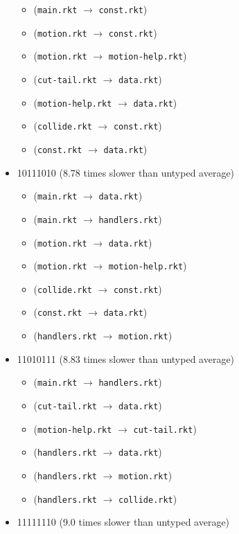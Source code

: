 \documentclass{article}
\newcommand{\mono}[1]{\texttt{#1}}
\begin{document}
\begin{itemize}
\begin{itemize}
  \item (\mono{main.rkt} $\rightarrow$ \mono{const.rkt})
  \item (\mono{motion.rkt} $\rightarrow$ \mono{const.rkt})
  \item (\mono{motion.rkt} $\rightarrow$ \mono{motion-help.rkt})
  \item (\mono{cut-tail.rkt} $\rightarrow$ \mono{data.rkt})
  \item (\mono{motion-help.rkt} $\rightarrow$ \mono{data.rkt})
  \item (\mono{collide.rkt} $\rightarrow$ \mono{const.rkt})
  \item (\mono{const.rkt} $\rightarrow$ \mono{data.rkt})
  \end{itemize}
\item 10111010 (8.78 times slower than untyped average)
  \begin{itemize}
  \item (\mono{main.rkt} $\rightarrow$ \mono{data.rkt})
  \item (\mono{main.rkt} $\rightarrow$ \mono{handlers.rkt})
  \item (\mono{motion.rkt} $\rightarrow$ \mono{data.rkt})
  \item (\mono{motion.rkt} $\rightarrow$ \mono{motion-help.rkt})
  \item (\mono{collide.rkt} $\rightarrow$ \mono{const.rkt})
  \item (\mono{const.rkt} $\rightarrow$ \mono{data.rkt})
  \item (\mono{handlers.rkt} $\rightarrow$ \mono{motion.rkt})
  \end{itemize}
\item 11010111 (8.83 times slower than untyped average)
  \begin{itemize}
  \item (\mono{main.rkt} $\rightarrow$ \mono{handlers.rkt})
  \item (\mono{cut-tail.rkt} $\rightarrow$ \mono{data.rkt})
  \item (\mono{motion-help.rkt} $\rightarrow$ \mono{cut-tail.rkt})
  \item (\mono{handlers.rkt} $\rightarrow$ \mono{data.rkt})
  \item (\mono{handlers.rkt} $\rightarrow$ \mono{motion.rkt})
  \item (\mono{handlers.rkt} $\rightarrow$ \mono{collide.rkt})
  \end{itemize}
\item 11111110 (9.0 times slower than untyped average)
  \begin{itemize}

\end{itemize}
\end{itemize}
\end{document}
